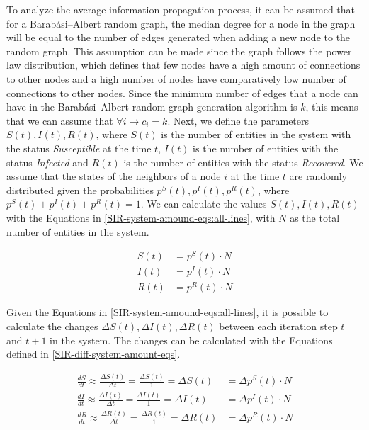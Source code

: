 To analyze the average information propagation process, 
it can be assumed that for a Barabási–Albert random graph, 
the median degree for a node in the graph will be equal to the number 
of edges generated when adding a new node to the random graph.
This assumption can be made since the graph follows the power law distribution,
which defines that few nodes have a high amount of connections to other nodes
and a high number of nodes have comparatively low number of connections to 
other nodes. Since the minimum number of edges that a node can have 
in the Barabási–Albert random graph generation algorithm is $k$, this 
means that we can assume that $\forall i \to c_i=k$.
Next, we define the parameters $S(t), I(t), R(t)$, where $S(t)$ is the number of
entities in the system with the status \textit{Susceptible} at the time $t$, 
$I(t)$ is the number of entities with the status \textit{Infected} and
$R(t)$ is the number of entities with the status \textit{Recovered}. 
We assume that the states of the neighbors of a node $i$ at the time $t$ are 
randomly distributed given the probabilities $p^S(t), p^I(t), p^R(t)$,
where $p^S(t) + p^I(t) + p^R(t) = 1$. We can calculate the values $S(t), I(t), R(t)$
with the Equations in \ref{SIR-system-amound-eqs:all-lines},
with $N$ as the total number of entities in the system.

\begin{subequations}
\begin{align}
    S(t) &=p^S(t)\cdot N \label{SIR-system-amound-eqs:1}\\
    I(t) &=p^I(t)\cdot N \label{SIR-system-amound-eqs:2}\\
    R(t) &=p^R(t)\cdot N \label{SIR-system-amound-eqs:3}
\end{align}
\label{SIR-system-amound-eqs:all-lines}
\end{subequations}

Given the Equations in \ref{SIR-system-amound-eqs:all-lines}, it is possible 
to calculate the changes $\Delta S(t), \Delta I(t), \Delta R(t)$ between each 
iteration step $t$ and $t+1$ in the system.
The changes can be calculated with the Equations defined in 
\ref{SIR-diff-system-amount-eqs}.

\begin{subequations}
\begin{align}
    \frac{dS}{dt} \approx \frac{\Delta S(t)}{\Delta t} = \frac{\Delta S(t)}{1} = \Delta S(t) &=\Delta p^S(t)\cdot N \label{SIR-diff-system-amount-eqs:1}\\
    \frac{dI}{dt} \approx \frac{\Delta I(t)}{\Delta t} = \frac{\Delta I(t)}{1} = \Delta I(t) &=\Delta p^I(t)\cdot N \label{SIR-diff-system-amount-eqs:2}\\
    \frac{dR}{dt} \approx \frac{\Delta R(t)}{\Delta t} = \frac{\Delta R(t)}{1} = \Delta R(t) &=\Delta p^R(t)\cdot N \label{SIR-diff-system-amount-eqs:3}
\end{align}
\label{SIR-diff-system-amount-eqs}
\end{subequations}

